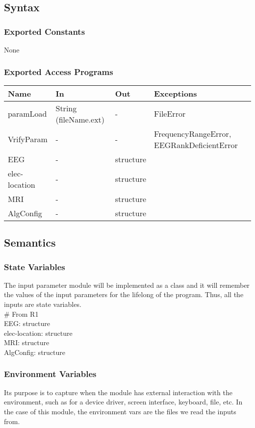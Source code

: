 \documentclass[12pt, titlepage]{article}
\begin{document}
\subsection{Syntax}
\subsubsection{Exported Constants}
None
\subsubsection{Exported Access Programs}

\begin{center}
\begin{tabular}{p{3cm} p{4cm} p{2cm} p{5cm}}
\hline
\textbf{Name} & \textbf{In} & \textbf{Out} & \textbf{Exceptions} \\
\hline
paramLoad & String (fileName.ext) & - & FileError \\
VrifyParam & - & - & FrequencyRangeError, EEGRankDeficientError \\
EEG & -& structure &  \\
elec-location & -& structure &  \\
MRI & -& structure &  \\
AlgConfig & -& structure &  \\
\hline
\end{tabular}
\end{center}

\subsection{Semantics}

\subsubsection{State Variables}
The input parameter module will be implemented as a class and it will remember the values of the input parameters for the lifelong of the program. Thus, all the inputs are state variables.\\

\# From R1\\
EEG: structure\\
elec-location: structure\\
MRI: structure\\
AlgConfig: structure\\

\subsubsection{Environment Variables}
Its purpose is to capture when the module has external interaction with the environment, such as for a device driver, screen interface, keyboard, file, etc. In the case of this module, the environment vars are the files we read the inputs from.\\
\end{document}
